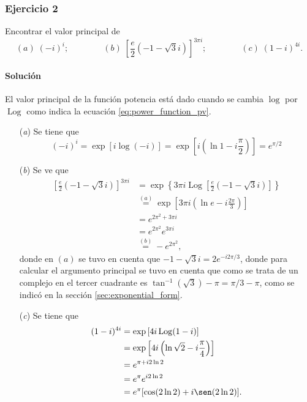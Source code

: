 \documentclass[a4paper]{report}
\DeclareMathOperator{\Log}{Log}
\begin{document}
\subsubsection{Ejercicio 2}

Encontrar el valor principal de 
\[
 (\textit{a})\;(-i)^i;\qquad\qquad 
 (\textit{b})\;\left[\frac{e}{2}(-1-\sqrt{3}i)\right]^{3\pi i};\qquad\qquad
 (\textit{c})\;(1-i)^{4i}.
\]

\paragraph{Solución}

El valor principal de la función potencia está dado cuando se cambia \(\log\) por \(\Log\) como indica la ecuación \ref{eq:power_function_pv}.

\begin{enumerate}
 \item[(\textit{a})] Se tiene que
 \[
  (-i)^i=\exp[i\log(-i)]=\exp\left[i\left(\ln1-i\frac{\pi}{2}\right)\right]=e^{\pi/2}
 \]
 \item[(\textit{b})] Se ve que 
 \begin{align*}
  \left[\frac{e}{2}(-1-\sqrt{3}i)\right]^{3\pi i}&=\exp\left\{3\pi i\Log\left[\frac{e}{2}(-1-\sqrt{3}i)\right]\right\}\\
  &\overset{(a)}{=}\exp\left[3\pi i\left(\ln e-i\frac{2\pi}{3}\right)\right]\\
  &=e^{2\pi^2+3\pi i}\\
  &=e^{2\pi^2}e^{3\pi i}\\
  &\overset{(b)}{=}-e^{2\pi^2},
 \end{align*}
 donde en \((a)\) se tuvo en cuenta que \(-1-\sqrt{3}i=2e^{-i2\pi/3}\), donde para calcular el argumento principal se tuvo en cuenta que como se trata de un complejo en el tercer cuadrante es \(\tan^{-1}(\sqrt{3})-\pi=\pi/3-\pi\), como se indicó en la sección \ref{sec:exponential_form}.
 \item[(\textit{c})] Se tiene que 
 \begin{align*}
  (1-i)^{4i}&=\exp\left[4i\Log(1-i)\right]\\
   &=\exp\left[4i\left(\ln\sqrt{2}-i\frac{\pi}{4}\right)\right]\\
   &=e^{\pi+i2\ln2}\\
   &=e^{\pi}e^{i2\ln2}\\
   &=e^{\pi}[\cos(2\ln2)+i\sen(2\ln2)].
 \end{align*}
\end{enumerate} 
\end{document}
